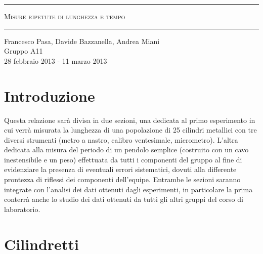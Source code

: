\documentclass[12pt, twoside, a4paper]{article}
\begin{document}
\begin{titlepage}
\begin{center}
	\hrule \vspace{0.5cm}
     	\textsc{\LARGE Misure ripetute di lunghezza e tempo}
	\vspace{0.5cm} \hrule \vspace{2cm}
      	{\large Francesco Pasa, Davide Bazzanella, Andrea Miani\\
		Gruppo A11}\\
	\vspace{0.5cm}
      	{\large 28 febbraio 2013 - 11 marzo 2013}
	\vfill
	{\begin{abstract}
Misura della lunghezza di un gruppo di 25 cilindri di metallo e della durata del periodo di oscillazione di un pendolo semplice.
Analisi dei valori ottenuti dagli esperimenti del singolo gruppo e dei valori raccolti dagli esperimenti di tutti i gruppi di laboratorio.
	 \end{abstract}}
\end{center}
\end{titlepage}

\newpage

\vspace*{\fill}
\begin{center}
	\tableofcontents
\end{center}
\vspace*{\fill}

\newpage

\section{Introduzione}
Questa relazione sarà divisa in due sezioni, una dedicata al primo esperimento in cui verrà misurata la lunghezza di una popolazione di 25 cilindri metallici con tre diversi strumenti (metro a nastro, calibro ventesimale, micrometro). L'altra dedicata alla misura del periodo di un pendolo semplice (costruito con un cavo inestensibile e un peso) effettuata da tutti i componenti del gruppo al fine di evidenziare la presenza di eventuali errori sistematici, dovuti alla differente prontezza di riflessi dei componenti dell'equipe. Entrambe le sezioni saranno integrate con l'analisi dei dati ottenuti dagli esperimenti, in particolare la prima conterrà anche lo studio dei dati ottenuti da tutti gli altri gruppi del corso di laboratorio.

\section{Cilindretti}
\end{document}
